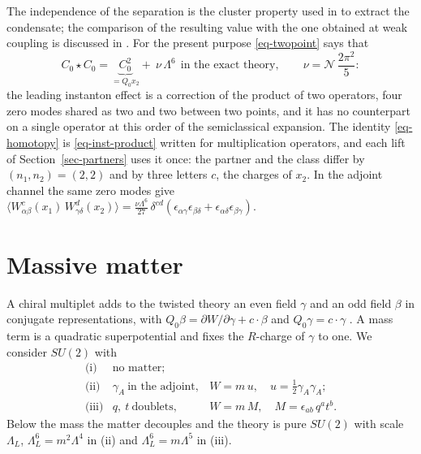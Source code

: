 \documentclass[11pt]{article}
\numberwithin{equation}{section}
\numberwithin{figure}{section}
\numberwithin{table}{section}
\theoremstyle{definition}
\begin{document}
The independence of the separation is the cluster property used in \cite{NSVZ} to extract the condensate; the comparison of the resulting value with the one obtained at weak coupling is discussed in \cite{HKLM,DHKM}. For the present purpose \eqref{eq-twopoint} says that
\begin{equation}\label{eq-inst-product}
C_0\star C_0=\underbrace{C_0^2}_{=Q_0x_2}+\ \nu\,\Lambda^6\ \ \text{in the exact theory},\qquad \nu=\mathcal N\,\frac{2\pi^2}{5}:
\end{equation}
the leading instanton effect is a correction of the product of two operators, four zero modes shared as two and two between two points, and it has no counterpart on a single operator at this order of the semiclassical expansion. The identity \eqref{eq-homotopy} is \eqref{eq-inst-product} written for multiplication operators, and each lift of Section~\ref{sec-partners} uses it once: the partner and the class differ by $(n_1,n_2)=(2,2)$ and by three letters $c$, the charges of $x_2$. In the adjoint channel the same zero modes give $\langle W^c_{\alpha\beta}(x_1)\,W^d_{\gamma\delta}(x_2)\rangle=\tfrac{\nu\Lambda^6}{27}\,\delta^{cd}(\epsilon_{\alpha\gamma}\epsilon_{\beta\delta}+\epsilon_{\alpha\delta}\epsilon_{\beta\gamma})$.

\section{Massive matter}\label{sec-matter}

A chiral multiplet adds to the twisted theory an even field $\gamma$ and an odd field $\beta$ in conjugate representations, with $Q_0\beta=\partial W/\partial\gamma+c\cdot\beta$ and $Q_0\gamma=c\cdot\gamma$ \cite[Section~4]{semichiral}. A mass term is a quadratic superpotential and fixes the $R$-charge of $\gamma$ to one. We consider $SU(2)$ with
\begin{equation}\label{eq-theories}
\begin{array}{lll}
\text{(i)} & \text{no matter}; & \\
\text{(ii)} & \gamma_A\ \text{in the adjoint}, & W=m\,u,\quad u=\tfrac12\gamma_A\gamma_A;\\
\text{(iii)} & q,\ t\ \text{doublets}, & W=m\,M,\quad M=\epsilon_{ab}\,q^at^b .
\end{array}
\end{equation}
Below the mass the matter decouples and the theory is pure $SU(2)$ with scale $\Lambda_L$, $\Lambda_L^6=m^2\Lambda^4$ in (ii) and $\Lambda_L^6=m\Lambda^5$ in (iii).
\end{document}
